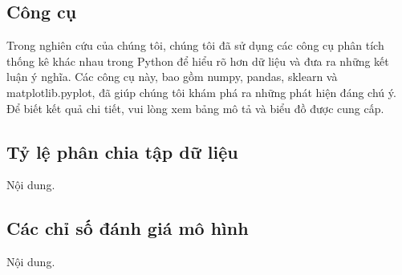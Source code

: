 \subsection{Công cụ}
Trong nghiên cứu của chúng tôi, chúng tôi đã sử dụng các công cụ phân tích thống kê khác nhau trong Python để hiểu rõ hơn dữ liệu và đưa ra những kết luận ý nghĩa. Các công cụ này, bao gồm numpy, pandas, sklearn và matplotlib.pyplot, đã giúp chúng tôi khám phá ra những phát hiện đáng chú ý. Để biết kết quả chi tiết, vui lòng xem bảng mô tả và biểu đồ được cung cấp.

\subsection{Tỷ lệ phân chia tập dữ liệu}
Nội dung.

\subsection{Các chỉ số đánh giá mô hình}
Nội dung.
